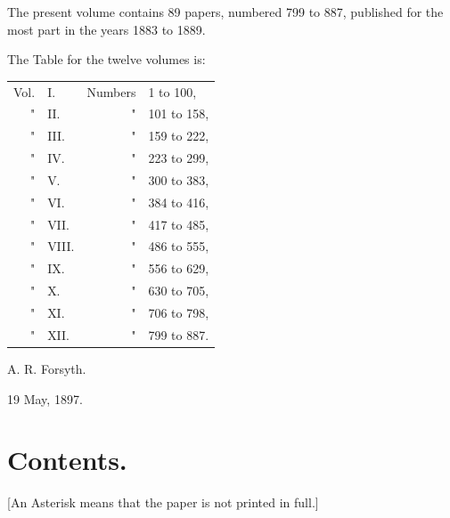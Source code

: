 \documentclass[11pt,a4paper]{article}
\theoremstyle{definition}
\theoremstyle{remark}
\begin{document}
The present volume contains 89 papers, numbered 799 to 887, published for the most part in the years 1883 to 1889.

The Table for the twelve volumes is:
\begin{center}
\begin{tabular}{r@{ }l@{ }r@{ }l}
Vol. & I. & Numbers & 1 to 100,\\
" & II. & " & 101 to 158,\\
" & III. & " & 159 to 222,\\
" & IV. & " & 223 to 299,\\
" & V. & " & 300 to 383,\\
" & VI. & " & 384 to 416,\\
" & VII. & " & 417 to 485,\\
" & VIII. & " & 486 to 555,\\
" & IX. & " & 556 to 629,\\
" & X. & " & 630 to 705,\\
" & XI. & " & 706 to 798,\\
" & XII. & " & 799 to 887.
\end{tabular}
\end{center}

\hfill A. R. Forsyth.

\hfill 19 May, 1897.
\cleardoublepage

\section*{Contents.}

[An Asterisk means that the paper is not printed in full.]

\bigskip
\end{document}
